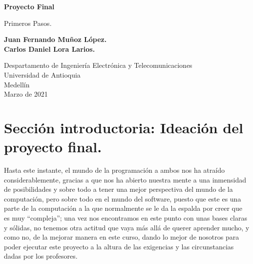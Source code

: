 \documentclass{article}
\begin{document}
\begin{titlepage}
    \begin{center}
        \vspace*{1cm}
            
        \Huge
        \textbf{Proyecto Final }
            
        \vspace{0.5cm}
        \LARGE
        Primeros Pasos.
            
        \vspace{1.5cm}
            
        \textbf{
        Juan Fernando Muñoz López.\\
        Carlos Daniel Lora Larios.
        }
            
        \vfill
            
        \vspace{0.8cm}
            
        \Large
        Despartamento de Ingeniería Electrónica y Telecomunicaciones\\
        Universidad de Antioquia\\
        Medellín\\
        Marzo de 2021
            
    \end{center}
\end{titlepage}

\tableofcontents
\newpage
\section{Sección introductoria: Ideación del proyecto final.}\label{intro}

Hasta este instante, el mundo de la programación a ambos nos ha atraído considerablemente, gracias a que nos ha abierto nuestra mente a una inmensidad de posibilidades y sobre todo a tener una mejor perspectiva del mundo de la computación, pero sobre todo en el mundo del software, puesto  que este es una parte de la computación a la que normalmente se le da la espalda por creer que es muy “compleja”; una vez nos encontramos en este punto con unas bases claras y sólidas, no tenemos otra actitud que vaya más allá de querer aprender mucho, y como no, de la mejorar manera en este curso, dando lo mejor de nosotros para poder ejecutar este proyecto a la altura de las exigencias y las circunstancias dadas por los profesores.
\end{document}
